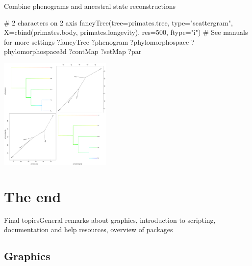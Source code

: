 \documentclass[compress, ucs, xelatex, 11pt, xcolor=svgnames,
  hyperref={
    bookmarks=true,
    unicode=true,
    colorlinks=true,
    pdftitle={Molecular data in R},
    plainpages=false,
    pdfauthor={Vojtech Zeisek},
    pdfsubject={Course about phylogeny and evolution in R},
    pdfcreator={XeLaTeX},
    pdfkeywords={R, evolution, phylogeny, molecular data},
    linkcolor=Tomato,
    anchorcolor=SaddleBrown,
    citecolor=Goldenrod,
    filecolor=DarkMagenta,
    menucolor=Sienna,
    urlcolor=DarkTurquoise,
    pdftex},
  url={hyphens, lowtilde} %
  ]{beamer}
\begin{document}
\begin{frame}[fragile]{Combine phenograms and ancestral state reconstructions}
\begin{multicols}{2}
  \begin{spluscode}
    # 2 characters on 2 axis
    fancyTree(tree=primates.tree,
      type="scattergram",
      X=cbind(primates.body,
      primates.longevity),
      res=500, ftype="i")
    # See manuals for more settings
    ?fancyTree
    ?phenogram
    ?phylomorphospace
    ?phylomorphospace3d
    ?contMap
    ?setMap
    ?par
  \end{spluscode}
  \begin{center}
    \includegraphics[height=5.5cm]{phenogram-ace.png}
  \end{center}
\end{multicols}
\end{frame}

%

\section{The end}

\begin{frame}{Final topics}{General remarks about graphics, introduction to scripting, documentation and help resources, overview of packages}
  \tableofcontents[currentsection, sectionstyle=show/hide, hideothersubsections]
\end{frame}

\subsection{Graphics}
\end{document}
